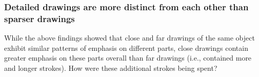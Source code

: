 \documentclass[10pt,letterpaper]{article}
\newcommand\norm[1]{\left\lVert#1\right\rVert}
\begin{document}

\subsubsection{Detailed drawings are more distinct from each other than sparser drawings}


While the above findings showed that close and far drawings of the same object exhibit similar patterns of emphasis on different parts, close drawings contain greater emphasis on these parts overall than far drawings (i.e., contained more and longer strokes). 
How were these additional strokes being spent? 
\end{document}
